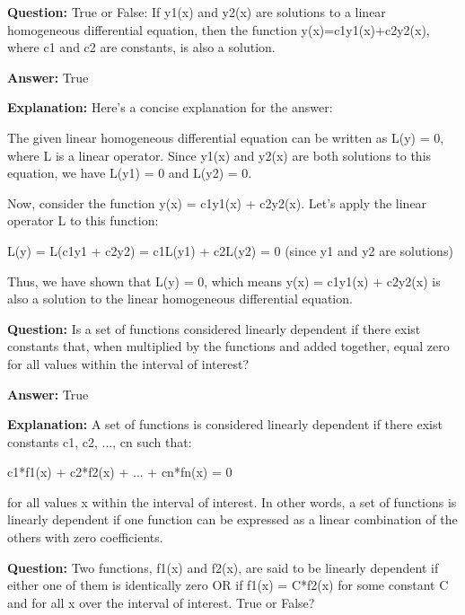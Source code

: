 \documentclass{article}
\begin{document}
                \vspace{0.5cm} 
        
            
                \textbf {Question:} True or False: If y1(x) and y2(x) are solutions to a linear homogeneous differential equation, then the function y(x)=c1y1(x)+c2y2(x), where c1 and c2 are constants, is also a solution.
                
                \textbf{Answer:} True

                \textbf{Explanation:} Here's a concise explanation for the answer:

The given linear homogeneous differential equation can be written as L(y) = 0, where L is a linear operator. Since y1(x) and y2(x) are both solutions to this equation, we have L(y1) = 0 and L(y2) = 0.

Now, consider the function y(x) = c1y1(x) + c2y2(x). Let's apply the linear operator L to this function:

L(y) = L(c1y1 + c2y2)
= c1L(y1) + c2L(y2)
= 0 (since y1 and y2 are solutions)

Thus, we have shown that L(y) = 0, which means y(x) = c1y1(x) + c2y2(x) is also a solution to the linear homogeneous differential equation.
                
                \vspace{0.5cm} 
        
            
                \textbf {Question:} Is a set of functions considered linearly dependent if there exist constants that, when multiplied by the functions and added together, equal zero for all values within the interval of interest?
                
                \textbf{Answer:} True

                \textbf{Explanation:} A set of functions is considered linearly dependent if there exist constants c1, c2, ..., cn such that:

c1*f1(x) + c2*f2(x) + ... + cn*fn(x) = 0

for all values x within the interval of interest. In other words, a set of functions is linearly dependent if one function can be expressed as a linear combination of the others with zero coefficients.
                
                \vspace{0.5cm} 
        
            
                \textbf {Question:} Two functions, f1(x) and f2(x), are said to be linearly dependent if either one of them is identically zero OR if f1(x) = C*f2(x) for some constant C and for all x over the interval of interest. True or False?
                
\end{document}
